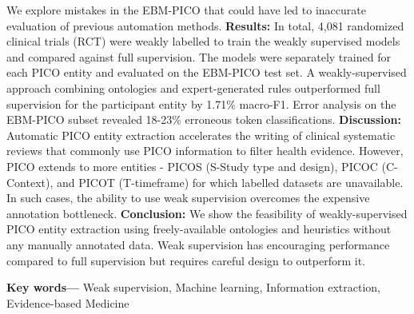 \documentclass[10.7pt,]{article}
\providecommand{\keywords}[1]
{
  \small	
  \textbf{Key words---} #1
}
\begin{document}
We explore mistakes in the EBM-PICO that could have led to inaccurate evaluation of previous automation methods.
\textbf{Results:}
In total, 4,081 randomized clinical trials (RCT) were weakly labelled to train the weakly supervised models and compared against full supervision.
The models were separately trained for each PICO entity and evaluated on the EBM-PICO test set.
A weakly-supervised approach combining ontologies and expert-generated rules outperformed full supervision for the participant entity by 1.71\% macro-F1.
Error analysis on the EBM-PICO subset revealed 18-23\% erroneous token classifications.
\textbf{Discussion:}
Automatic PICO entity extraction accelerates the writing of clinical systematic reviews that commonly use PICO information to filter health evidence.
However, PICO extends to more entities - PICOS (S-Study type and design), PICOC (C-Context), and PICOT (T-timeframe) for which labelled datasets are unavailable.
In such cases, the ability to use weak supervision overcomes the expensive annotation bottleneck.
\textbf{Conclusion:}
We show the feasibility of weakly-supervised PICO entity extraction using freely-available ontologies and heuristics without any manually annotated data. Weak supervision has encouraging performance compared to full supervision but requires careful design to outperform it. 


\keywords{Weak supervision, Machine learning, Information extraction, Evidence-based Medicine}


%
\clearpage
%
\end{document}
